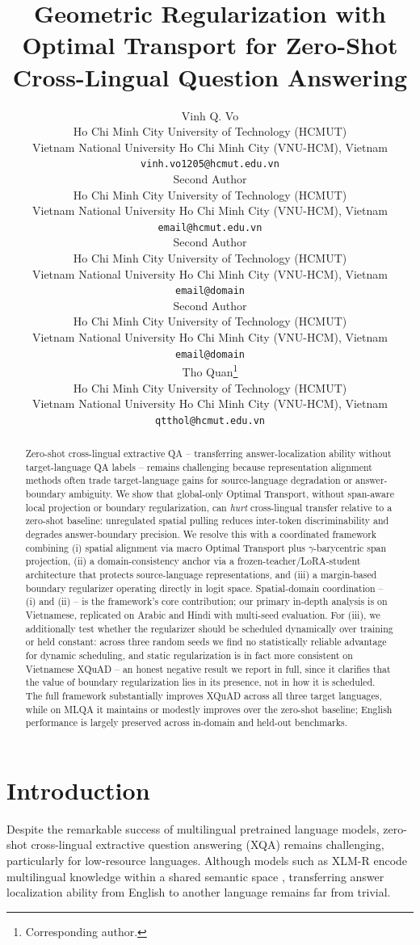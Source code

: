 \documentclass[11pt]{article}
\title{Geometric Regularization with Optimal Transport for Zero-Shot Cross-Lingual Question Answering}
\author{Vinh Q. Vo \\
  Ho Chi Minh City University of Technology (HCMUT) \\
  Vietnam National University Ho Chi Minh City (VNU-HCM), Vietnam \\
  \texttt{vinh.vo1205@hcmut.edu.vn} \\\And
  Second Author \\
  Ho Chi Minh City University of Technology (HCMUT) \\
  Vietnam National University Ho Chi Minh City (VNU-HCM), Vietnam \\
  \texttt{email@hcmut.edu.vn} \\\And
  Second Author \\
  Ho Chi Minh City University of Technology (HCMUT) \\
  Vietnam National University Ho Chi Minh City (VNU-HCM), Vietnam \\
  \texttt{email@domain} \\\And
  Second Author \\
  Ho Chi Minh City University of Technology (HCMUT) \\
  Vietnam National University Ho Chi Minh City (VNU-HCM), Vietnam \\
  \texttt{email@domain} \\\And
  Tho Quan\thanks{Corresponding author.} \\
  Ho Chi Minh City University of Technology (HCMUT) \\
  Vietnam National University Ho Chi Minh City (VNU-HCM), Vietnam \\
  \texttt{qtthol@hcmut.edu.vn}}
\begin{document}
\raggedbottom
\maketitle
\begin{abstract}

Zero-shot cross-lingual extractive QA -- transferring answer-localization ability without target-language QA labels -- remains challenging because representation alignment methods often trade target-language gains for source-language degradation or answer-boundary ambiguity. We show that global-only Optimal Transport, without span-aware local projection or boundary regularization, can \emph{hurt} cross-lingual transfer relative to a zero-shot baseline: unregulated spatial pulling reduces inter-token discriminability and degrades answer-boundary precision. We resolve this with a coordinated framework combining (i) spatial alignment via macro Optimal Transport plus $\gamma$-barycentric span projection, (ii) a domain-consistency anchor via a frozen-teacher/LoRA-student architecture that protects source-language representations, and (iii) a margin-based boundary regularizer operating directly in logit space. Spatial-domain coordination -- (i) and (ii) -- is the framework's core contribution; our primary in-depth analysis is on Vietnamese, replicated on Arabic and Hindi with multi-seed evaluation. For (iii), we additionally test whether the regularizer should be scheduled dynamically over training or held constant: across three random seeds we find no statistically reliable advantage for dynamic scheduling, and static regularization is in fact more consistent on Vietnamese XQuAD -- an honest negative result we report in full, since it clarifies that the value of boundary regularization lies in its presence, not in how it is scheduled. The full framework substantially improves XQuAD across all three target languages, while on MLQA it maintains or modestly improves over the zero-shot baseline; English performance is largely preserved across in-domain and held-out benchmarks.


\end{abstract}

\section{Introduction}
\label{sec:intro}
Despite the remarkable success of multilingual pretrained language models, zero-shot cross-lingual extractive question answering (XQA) remains challenging, particularly for low-resource languages. Although models such as XLM-R encode multilingual knowledge within a shared semantic space \citep{wu-dredze-2019-beto}, transferring answer localization ability from English to another language remains far from trivial.
\end{document}
